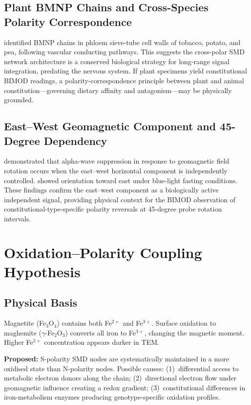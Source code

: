 \documentclass[12pt,a4paper]{article}
\begin{document}
\subsection{Plant BMNP Chains and Cross-Species Polarity Correspondence}
\cite{gorobets2023} identified BMNP chains in phloem sieve-tube cell
walls of tobacco, potato, and pea, following vascular conducting
pathways.  This suggests the cross-polar SMD network architecture is
a conserved biological strategy for long-range signal integration,
predating the nervous system.  If plant specimens yield constitutional
BIMOD readings, a polarity-correspondence principle between plant and
animal constitution---governing dietary affinity and antagonism---may
be physically grounded.

\subsection{East--West Geomagnetic Component and 45-Degree Dependency}
\cite{wang2019} demonstrated that alpha-wave suppression in response
to geomagnetic field rotation occurs when the east--west horizontal
component is independently controlled.  \cite{chae2019} showed
orientation toward east under blue-light fasting conditions.  These
findings confirm the east--west component as a biologically active
independent signal, providing physical context for the BIMOD
observation of constitutional-type-specific polarity reversals at
45-degree probe rotation intervals.

\section{Oxidation--Polarity Coupling Hypothesis}

\subsection{Physical Basis}
Magnetite (Fe$_3$O$_4$) contains both Fe$^{2+}$ and Fe$^{3+}$.
Surface oxidation to maghemite ($\gamma$-Fe$_2$O$_3$) converts all
iron to Fe$^{3+}$, changing the magnetic moment.  Higher Fe$^{3+}$
concentration appears darker in TEM.

\textbf{Proposed:} S-polarity SMD nodes are systematically maintained
in a more oxidised state than N-polarity nodes.  Possible causes:
(1)~differential access to metabolic electron donors along the chain;
(2)~directional electron flow under geomagnetic influence creating a
redox gradient; (3)~constitutional differences in iron-metabolism
enzymes producing genotype-specific oxidation profiles.
\end{document}
